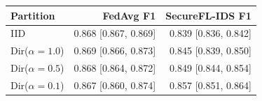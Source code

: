 \begin{tabular}{lrr}
\toprule
Partition & FedAvg F1 & SecureFL-IDS F1 \\
\midrule
IID & 0.868 [0.867, 0.869] & 0.839 [0.836, 0.842] \\
Dir($\alpha{=}1.0$) & 0.869 [0.866, 0.873] & 0.845 [0.839, 0.850] \\
Dir($\alpha{=}0.5$) & 0.868 [0.864, 0.872] & 0.849 [0.844, 0.854] \\
Dir($\alpha{=}0.1$) & 0.867 [0.860, 0.874] & 0.857 [0.851, 0.864] \\
\bottomrule
\end{tabular}
